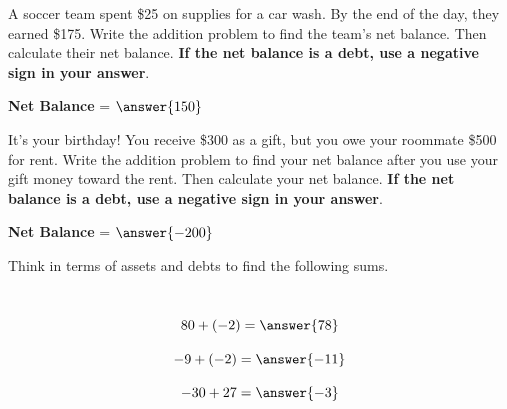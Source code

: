 \documentclass{ximera}[font=12pt]
\begin{document}
\begin{problem}
A soccer team spent \$25 on supplies for a car wash.  By the end of the day, they earned \$175. Write the addition problem to find 
the team's net balance.  Then calculate their net balance.  \textbf{If the net balance is a debt, use a negative sign in your answer}. 


\begin{multipleChoice}
\end{multipleChoice}


\textcolor{accessibleOrange}{\textbf{Net Balance}} = $\answer{150}$


\end{problem}


\begin{problem}
It's your birthday!  You receive \$300 as a gift, but you owe your roommate \$500 for rent. Write the addition problem to 
find your net balance after you use your gift money toward the rent.  Then calculate your net balance.  \textbf{If the net balance is a debt, 
use a negative sign in your answer}.

\begin{multipleChoice}
\end{multipleChoice}

\textcolor{accessibleOrange}{\textbf{Net Balance}} = $\answer{-200}$

\end{problem}

\begin{problem}
Think in terms of assets and debts to find the following sums. 

~ \\[0.5em]

\[ 80 + (-2)  =\answer{78} \]

\[ -9 + (-2)  =\answer{-11} \]

\[ -30 + 27 =\answer{-3}\]

\end{problem}
\end{document}
